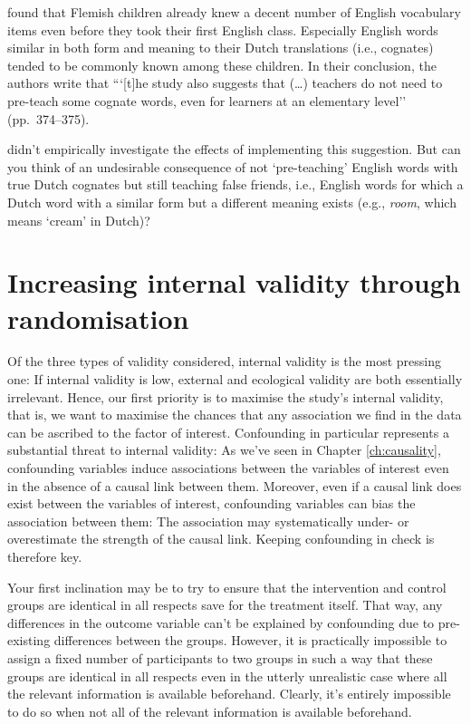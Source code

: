   
  \citet{DeWilde2020} found that Flemish children already knew
  a decent number of English vocabulary items even before they took their
  first English class.
  Especially English words similar in both form and meaning to their 
  Dutch translations (i.e., cognates) tended to be commonly known among
  these children.
  In their conclusion, the authors write that
  ```[t]he study also suggests that (\dots) teachers do not need to pre-teach
  some cognate words, even for learners at an elementary level'' (pp.~374--375).
  
  \citet{DeWilde2020} didn't empirically investigate the effects of implementing
  this suggestion. But can you think of an undesirable consequence
  of not `pre-teaching' English words with true Dutch cognates
  but still teaching false friends, i.e., English words for which a Dutch
  word with a similar form but a different meaning exists 
  (e.g., \textit{room}, which means `cream' in Dutch)?
\parend

\section{Increasing internal validity through randomisation}
Of the three types of validity considered, 
internal validity is the most pressing one:
If internal validity is low, external and ecological validity are both
essentially irrelevant.
Hence,
our first priority is to maximise the study's internal validity, that is,
we want to maximise the chances that any association we find in the data
can be ascribed to the factor of interest.
Confounding in particular represents a substantial threat to internal validity:
As we've seen in Chapter \ref{ch:causality}, confounding variables induce
associations between the variables of interest even in the absence of a causal
link between them. Moreover, even if a causal link does exist between the
variables of interest, confounding variables can bias the association
between them: The association may systematically under- or overestimate the
strength of the causal link. Keeping confounding in check is therefore key.

Your first inclination may be to try to ensure that the intervention and
control groups are identical in all respects save for the treatment itself.
That way, any differences in the outcome variable can't be explained by
confounding due to pre-existing differences between the groups.
However, it is practically
impossible to assign a fixed number of participants to two groups in such a
way that these groups are identical in all respects even in the utterly
unrealistic case where all the relevant information is available beforehand.
Clearly, it's entirely impossible to do so when not all of the relevant information
is available beforehand.

